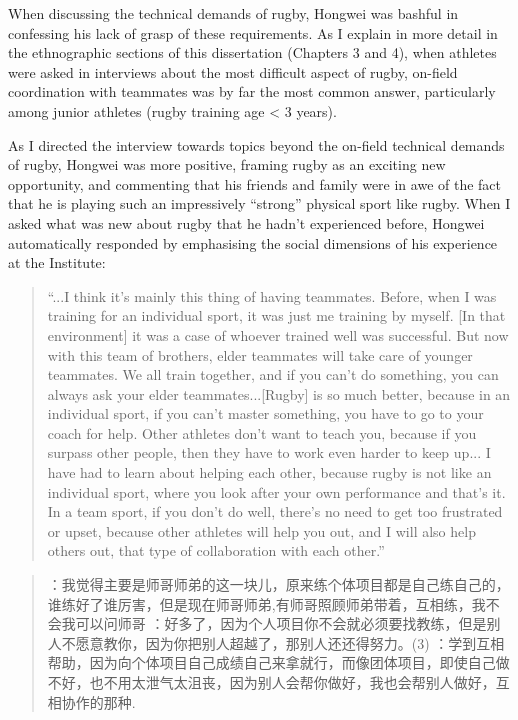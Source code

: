 When discussing the technical demands of rugby, Hongwei was bashful in confessing his lack of grasp of these requirements. As I explain in more detail in the ethnographic sections of this dissertation (Chapters 3 and 4), when athletes were asked in interviews about the most difficult aspect of rugby, on-field coordination with teammates was by far the most common answer, particularly among junior athletes (rugby training age < 3 years).

As I directed the interview towards topics beyond the on-field technical demands of rugby, Hongwei was more positive, framing rugby as an exciting new opportunity, and commenting that his friends and family were in awe of the fact that he is playing such an impressively ``strong'' physical sport like rugby. When I asked what was new about rugby that he hadn't experienced before, Hongwei automatically responded by emphasising the social dimensions of his experience at the Institute:

\begin{quotation}
  ``...I think it's mainly this thing of having teammates. Before, when I was training for an individual sport, it was just me training by myself. [In that environment] it was a case of whoever trained well was successful.  But now with this team of brothers, elder teammates will take care of younger teammates. We all train together, and if you can’t do something, you can always ask your elder teammates...[Rugby] is so much better, because in an individual sport, if you can't master something, you have to go to your coach for help. Other athletes don't want to teach you, because if you surpass other people, then they have to work even harder to keep up... I have had to learn about helping each other, because rugby is not like an individual sport, where you look after your own performance and that's it.  In a team sport, if you don't do well, there's no need to get too frustrated or upset, because other athletes will help you out, and I will also help others out, that type of collaboration with each other.''
\end{quotation}

\begin{CJK}{UTF8}{gbsn}
  \begin{quotation}
    ：我觉得主要是师哥师弟的这一块儿，原来练个体项目都是自己练自己的，谁练好了谁厉害，但是现在师哥师弟,有师哥照顾师弟带着，互相练，我不会我可以问师哥
    ：好多了，因为个人项目你不会就必须要找教练，但是别人不愿意教你，因为你把别人超越了，那别人还还得努力。(3) ：学到互相帮助，因为向个体项目自己成绩自己来拿就行，而像团体项目，即使自己做不好，也不用太泄气太沮丧，因为别人会帮你做好，我也会帮别人做好，互相协作的那种.
  \end{quotation}
\end{CJK}

